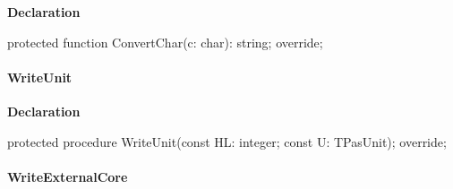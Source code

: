 \documentclass{report}
\newif\ifpdf
\begin{document}
\label{PasDoc_GenSimpleXML.TSimpleXMLDocGenerator-ConvertChar}
\begin{list}{}{
\setlength{\itemindent}{0cm}
\setlength{\listparindent}{0cm}
\setlength{\leftmargin}{\evensidemargin}
\addtolength{\leftmargin}{\tmplength}
\settowidth{\labelsep}{X}
\addtolength{\leftmargin}{\labelsep}
\setlength{\labelwidth}{\tmplength}
}
\item[\textbf{Declaration}\hfill]
\ifpdf
\begin{flushleft}
\fi
\begin{ttfamily}
protected function ConvertChar(c: char): string; override;\end{ttfamily}

\ifpdf
\end{flushleft}
\fi

\end{list}
\paragraph*{WriteUnit}\hspace*{\fill}

\label{PasDoc_GenSimpleXML.TSimpleXMLDocGenerator-WriteUnit}
\begin{list}{}{
\setlength{\itemindent}{0cm}
\setlength{\listparindent}{0cm}
\setlength{\leftmargin}{\evensidemargin}
\addtolength{\leftmargin}{\tmplength}
\settowidth{\labelsep}{X}
\addtolength{\leftmargin}{\labelsep}
\setlength{\labelwidth}{\tmplength}
}
\item[\textbf{Declaration}\hfill]
\ifpdf
\begin{flushleft}
\fi
\begin{ttfamily}
protected procedure WriteUnit(const HL: integer; const U: TPasUnit); override;\end{ttfamily}

\ifpdf
\end{flushleft}
\fi

\end{list}
\paragraph*{WriteExternalCore}\hspace*{\fill}
\end{document}
